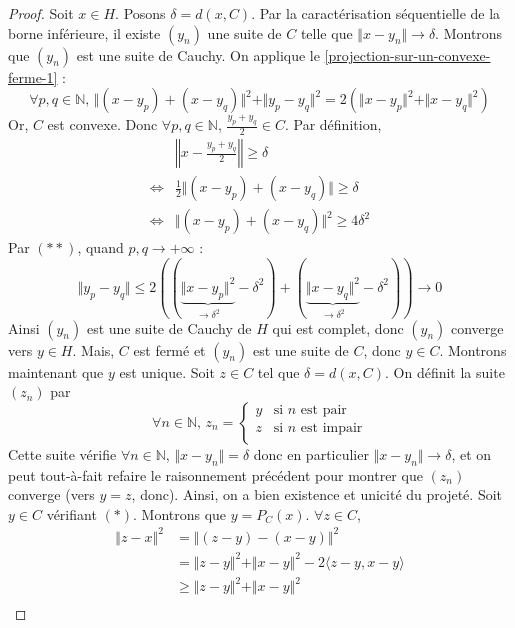 	\begin{proof}
		Soit $x \in H$. Posons $\delta = d(x, C)$. Par la caractérisation séquentielle de la borne inférieure, il existe $(y_n)$ une suite de $C$ telle que $\Vert x - y_n \Vert \longrightarrow \delta$. Montrons que $(y_n)$ est une suite de Cauchy. On applique le \cref{projection-sur-un-convexe-ferme-1} :
		\[ \forall p, q \in \mathbb{N}, \, \Vert (x - y_p) + (x - y_q) \Vert^2 + \Vert y_p - y_q \Vert^2 = 2(\Vert x - y_p \Vert^2 + \Vert x - y_q \Vert^2) \tag{$**$} \]
		Or, $C$ est convexe. Donc $\forall p, q \in \mathbb{N}$, $\frac{y_p + y_q}{2} \in C$.
		Par définition,
		\begin{align*}
			& \left\Vert x - \frac{y_p + y_q}{2} \right\Vert \geq \delta \\
			\iff& \frac{1}{2} \Vert (x - y_p) + (x - y_q) \Vert \geq \delta \\
			\iff& \Vert (x - y_p) + (x - y_q) \Vert^2 \geq 4 \delta^2
		\end{align*}
		Par $(**)$, quand $p, q \longrightarrow +\infty$ :
		\[ \Vert y_p - y_q \Vert \leq 2((\underbrace{\Vert x - y_p \Vert^2}_{\longrightarrow \delta^2} - \delta^2) + (\underbrace{\Vert x - y_q \Vert^2}_{\longrightarrow \delta^2} - \delta^2)) \longrightarrow 0 \]
		Ainsi $(y_n)$ est une suite de Cauchy de $H$ qui est complet, donc $(y_n)$ converge vers $y \in H$. Mais, $C$ est fermé et $(y_n)$ est une suite de $C$, donc $y \in C$.
		\newpar
		Montrons maintenant que $y$ est unique. Soit $z \in C$ tel que $\delta = d(x, C)$. On définit la suite $(z_n)$ par
		\[ \forall n \in \mathbb{N}, \, z_n =
		\begin{cases}
			y &\text{si } n \text{ est pair} \\
			z &\text{si } n \text{ est impair} \\
		\end{cases}
		\]
		Cette suite vérifie $\forall n \in \mathbb{N}$, $\Vert x - y_n \Vert = \delta$ donc en particulier $\Vert x - y_n \Vert \longrightarrow \delta$, et on peut tout-à-fait refaire le raisonnement précédent pour montrer que $(z_n)$ converge (vers $y = z$, donc). Ainsi, on a bien existence et unicité du projeté.
		\newpar
		Soit $y \in C$ vérifiant $(*)$. Montrons que $y = P_C(x)$. $\forall z \in C$,
		\begin{align*}
			\Vert z - x \Vert^2 &= \Vert (z - y) - (x - y) \Vert^2 \\
			&= \Vert z - y \Vert^2 + \Vert x - y \Vert^2 - 2 \langle z - y, x - y \rangle \\
			&\geq \Vert z - y \Vert^2 + \Vert x - y \Vert^2 \\

\end{align*}
\end{proof}
